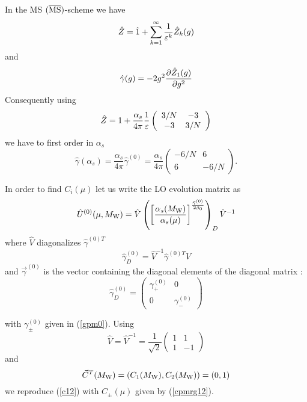 \documentclass[12pt,rotate]{article}
\def\eps{\varepsilon}
\def\as{\alpha_s}
\newcommand{\mw}{M_{\rm W}}
\newcommand{\be}{\begin{equation}}
\newcommand{\ee}{\end{equation}}
\def\aspi{\frac{\as}{4\pi}}
\begin{document}
\begin{itemize}
\begin{itemize}
\begin{itemize}
In the MS $(\overline{\rm MS})$-scheme we have
\begin{equation}\label{ziem}
\hat Z=\hat 1+\sum^\infty_{k=1} {1\over \eps^k} \hat Z_{k}(g)  
\end{equation}
and 
\begin{equation}\label{zi1m}
\hat\gamma(g)=-2 g^2{\partial \hat Z_{1}(g)\over\partial g^2}
\end{equation}
Consequently using
\begin{equation}\label{zll0} \hat Z = 1+ \aspi {1\over\eps}
 \left(\begin{array}{cc}  3/N & -3 \\
                          -3 & 3/N
    \end{array}\right)   \end{equation}
we have to first order in $\as$ \cite{MAIANI}
\begin{equation}\label{g120} \hat\gamma(\as)=\aspi \hat\gamma^{(0)}=\aspi
 \left(\begin{array}{cc} -6/N & 6 \\
                          6 & -6/N
    \end{array}\right).   \end{equation}

In order to find $C_i(\mu)$  let us write the LO evolution matrix
as
\begin{equation}\label{u0vd0} 
\hat U^{(0)}(\mu,\mw)= \hat V
\left({\left[{\as(\mw)\over\as(\mu)}
\right]}^{{\vec\gamma^{(0)}\over 2\beta_0}}
   \right)_D \hat V^{-1}   \end{equation}
where $\hat V$ diagonalizes ${\hat\gamma^{(0)T}}$
\begin{equation}\label{ga0d} 
\hat\gamma^{(0)}_D=\hat V^{-1} {\hat\gamma^{(0)T}} \hat V
  \end{equation}
and $\vec\gamma^{(0)}$ is the vector containing the diagonal elements of
the diagonal matrix :
\begin{equation}\label{g120d} \hat\gamma^{(0)}_D=
 \left(\begin{array}{cc} \gamma^{(0)}_+ & 0 \\
                          0 & \gamma^{(0)}_-
    \end{array}\right)   \end{equation}

with $\gamma^{(0)}_\pm$ given in (\ref{gpm0}). Using
\be
\hat V = \hat V^{-1} =\frac{1}{\sqrt{2}}
\left(\begin{array}{cc} 1  & 1 \\
                          1 & -1
    \end{array}\right)   \end{equation}
and
\be
\vec C^T(\mw)=(C_1(\mw), C_2(\mw))=(0,1)
\ee
we reproduce (\ref{c12}) with $C_\pm(\mu)$ given by (\ref{cpmrg12}).


\end{itemize}
\end{itemize}
\end{itemize}
\end{document}
